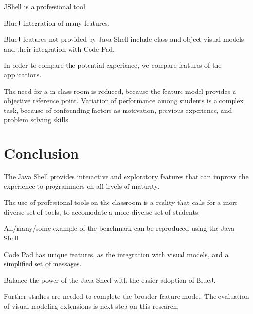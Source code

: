 \documentclass{article}
\begin{document}
JShell is a professional tool

BlueJ integration of many features.

BlueJ features not provided by Java Shell include class and object visual models and their integration with Code Pad.

In order to compare the potential experience, we compare features of the applications.

The need for a in class room is reduced, because the feature model provides a objective reference point. Variation of performance among students is a complex task, because of confounding factors as motivation, previous experience, and problem solving skills.


\section{Conclusion}

The Java Shell provides interactive and exploratory features that can improve the experience to programmers on all levels of maturity.

The use of professional tools on the classroom is a reality that calls for a more diverse set of tools, to accomodate a more diverse set of students.

All/many/some example of the benchmark can be reproduced using the Java Shell.

Code Pad has unique features, as the integration with visual models, and a simplified set of messages. 


Balance the power of the Java Sheel with the easier adoption of BlueJ.

Further studies are needed to complete the broader feature model. The evaluation of visual modeling extensions is next step on this research.




\end{document}
